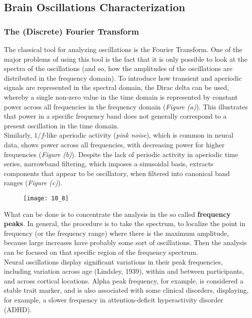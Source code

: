 \subsection{Brain Oscillations Characterization}
\subsubsection{The (Discrete) Fourier Transform}
The classical tool for analyzing oscillations is the Fourier Transform. One of the major problems of using this tool is the fact that 
it is only possible to look at the spectra of the oscillations (and so, how the amplitudes of the oscillations are distributed in the frequency domain). 
To introduce how transient and aperiodic signals are represented in the spectral domain, the Dirac delta can be used, whereby a single non-zero value 
in the time domain is represented by constant power across all frequencies in the frequency domain (\textit{Figure (a)}). This illustrates that power in a specific 
frequency band does not generally correspond to a present oscillation in the time domain.\\
Similarly, \(1/f\)-like aperiodic activity (\textit{pink noise}), which is common in neural data, shows power across all frequencies, with decreasing power for 
higher frequencies (\textit{Figure (b)}). 
Despite the lack of periodic activity in aperiodic time series, narrowband filtering, which imposes a sinusoidal basis, extracts components that appear to be oscillatory, 
when filtered into canonical band ranges (\textit{Figure (c)}).
\begin{figure}[H]
    \texttt{[image: 10\_8]}
    \centering
\end{figure}
What can be done is to concentrate the analysis in the so called \textbf{frequency peaks}. In general, the procedure is to take the spectrum, 
to localize the point in frequency (or the frequency range) where there is the maximum amplitude, because large increases have probably some sort of oscillations. 
Then the analysis can be focused on that specific region of the frequency spectrum.\\
Neural oscillations display significant variations in their peak frequencies, including variation across age (Lindsley, 1939), within and between participants, 
and across cortical locations. Alpha peak frequency, for example, is considered a stable trait marker, and is also associated with some clinical disorders, displaying, 
for example, a slower frequency in attention-deficit hyperactivity disorder (ADHD). 
